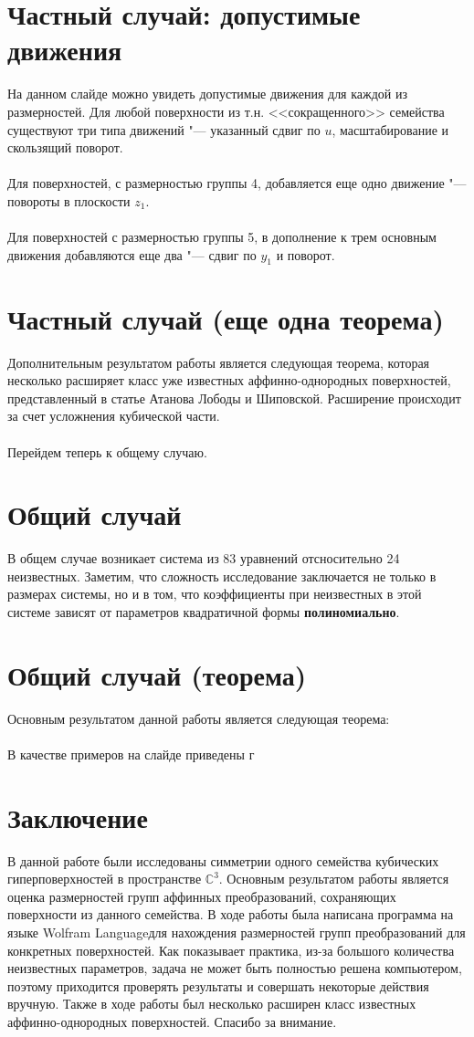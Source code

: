 \documentclass[a4paper,14pt]{extarticle}
\begin{document}
\section{Частный случай: допустимые движения}
На данном слайде можно увидеть допустимые движения для каждой из размерностей. Для любой поверхности из т.н. <<сокращенного>> семейства существуют три типа движений "--- указанный сдвиг по $u$, масштабирование и скользящий поворот.
\\~\\
Для поверхностей, с размерностью группы 4, добавляется еще одно движение "--- повороты в плоскости $z_1$.
\\~\\
Для поверхностей с размерностью группы 5, в дополнение к трем основным движения добавляются еще два "--- сдвиг по $y_1$ и поворот.

\section{Частный случай (еще одна теорема)}
Дополнительным результатом работы является следующая теорема, которая несколько расширяет класс уже известных аффинно-однородных поверхностей, представленный в статье Атанова Лободы и Шиповской. Расширение происходит за счет усложнения кубической части.
\\~\\
Перейдем теперь к общему случаю.

\section{Общий случай}
В общем случае возникает система из 83 уравнений отсносительно 24 неизвестных. Заметим, что сложность исследование заключается не только в размерах системы, но и в том, что коэффициенты при неизвестных в этой системе зависят от параметров квадратичной формы \textbf{полиномиально}.

\section{Общий случай (теорема)}
Основным результатом данной работы является следующая теорема:
\\~\\
В качестве примеров на слайде приведены г

\section{Заключение}
В данной работе были исследованы симметрии одного семейства кубических гиперповерхностей в пространстве $\mathbb{C}^3$. Основным результатом работы является оценка размерностей групп аффинных преобразований, сохраняющих поверхности из данного семейства. В ходе работы была написана программа на языке {\ttfamily Wolfram Language}для нахождения размерностей групп преобразований для конкретных поверхностей. Как показывает практика, из-за большого количества неизвестных параметров, задача не может быть полностью решена компьютером, поэтому приходится проверять результаты и совершать некоторые действия вручную. Также в ходе работы был несколько расширен класс известных аффинно-однородных поверхностей.
Спасибо за внимание.
\end{document}
